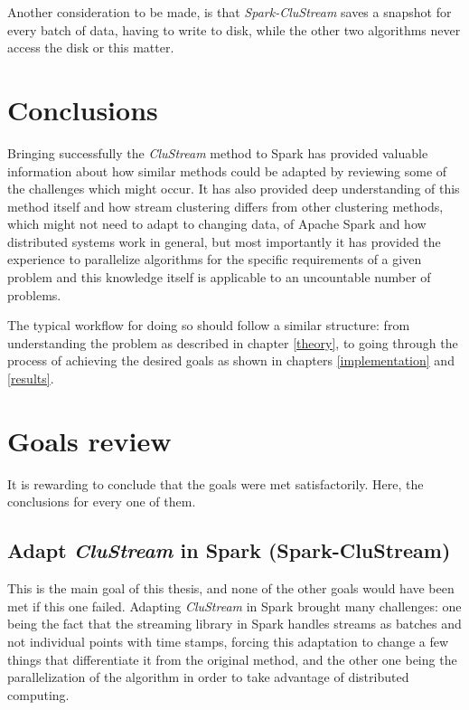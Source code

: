 \documentclass{llncs}
\begin{document}
Another consideration to be made, is that  \textit{Spark-CluStream} saves a snapshot for every batch of data, having to write to disk, while the other two algorithms never access the disk or this matter.



\section{Conclusions}

 
Bringing successfully the \textit{CluStream} method to Spark has provided valuable information about how similar methods could be adapted by reviewing some of the challenges which might occur. It has also provided deep understanding of this method itself and how stream clustering differs from other clustering methods, which might not need to adapt to changing data, of Apache Spark and how distributed systems work in general, but most importantly it has provided the experience to parallelize algorithms for the specific requirements of a given problem and this knowledge itself is applicable to an uncountable number of problems.

The typical workflow for doing so should follow a similar structure: from understanding the problem as described in chapter \ref{theory}, to going through the process of achieving the desired goals as shown in chapters \ref{implementation} and \ref{results}.

\section{Goals review}

It is rewarding to conclude that the goals were met satisfactorily. Here, the conclusions for every one of them.

\subsection{Adapt \textit{CluStream} in Spark (Spark-CluStream)}

This is the main goal of this thesis, and none of the other goals would have been met if this one failed. Adapting \textit{CluStream} in Spark brought many challenges: one being the fact that the streaming library in Spark handles streams as batches and not individual points with time stamps, forcing this adaptation to change a few things that differentiate it from the original method, and the other one being the parallelization of the algorithm in order to take advantage of distributed computing.
\end{document}
